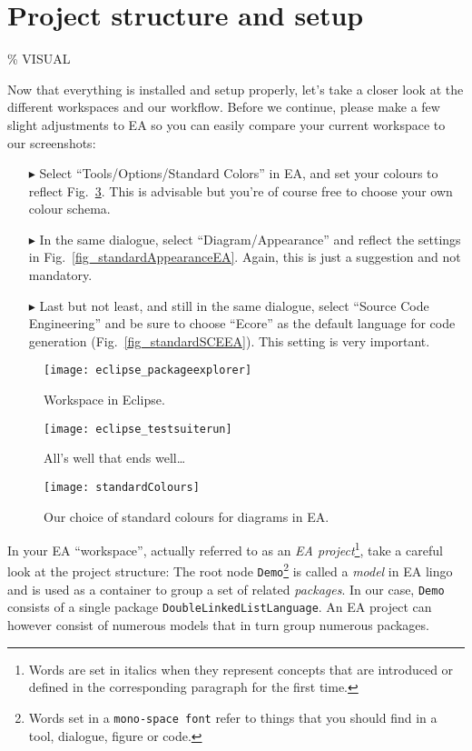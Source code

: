 \section{Project structure and setup}
\% VISUAL

Now that everything is installed and setup properly, let's take a closer look at the different workspaces and our workflow.
Before we continue, please make a few slight adjustments to EA so you can easily compare your current workspace to our screenshots:
\begin{enumerate} 

\item[$\blacktriangleright$] Select ``Tools/Options/Standard Colors'' in EA, and set your colours to reflect Fig.~\ref{fig_standardColoursEA}.
This is advisable but you're of course free to choose your own colour schema.

\item[$\blacktriangleright$] In the same dialogue, select ``Diagram/Appearance'' and reflect the settings in Fig.~\ref{fig_standardAppearanceEA}.
Again, this is just a suggestion and not mandatory.

\item[$\blacktriangleright$] Last but not least, and still in the same dialogue, select ``Source Code Engineering'' and be sure to choose ``Ecore'' as the default language for code generation (Fig.~\ref{fig_standardSCEEA}). This setting is very important.

\end{enumerate}

\begin{figure}[htbp]
	\centering
  \texttt{[image: eclipse\_packageexplorer]}
	\caption{Workspace in Eclipse.}
	\label{fig_eclipsepackageexplorer}
\end{figure}

\begin{figure}[htbp]
	\centering
  \texttt{[image: eclipse\_testsuiterun]}
	\caption{All's well that ends well\ldots}
	\label{fig_eclipsetestsuiterun}
\end{figure}

\begin{figure}[htbp]
  \centering
  \texttt{[image: standardColours]}
  \caption{Our choice of standard colours for diagrams in EA.}
  \label{fig_standardColoursEA}
\end{figure}


In your EA ``workspace'', actually referred to as an \emph{EA project}\footnote{Words are set in italics when they represent concepts that are introduced or defined  in the corresponding paragraph for the first time.}, take a careful  look at the project structure:  The root node \texttt{Demo}\footnote{Words set  in a \texttt{mono-space font} refer to things that you should find in a tool,  dialogue, figure or code.} is called a \emph{model} in EA lingo and is used as a  container to group a set of related \emph{packages}. 
In our case, \texttt{Demo}  consists of a single package \texttt{DoubleLinkedListLanguage}.
An EA project can however consist of numerous models that in turn group  numerous packages.

